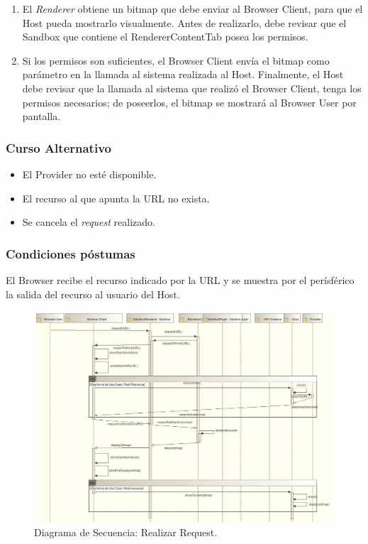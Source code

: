 \begin{enumerate}
		\item El \textit{Renderer} obtiene un bitmap que debe enviar al Browser Client, para que el Host pueda mostrarlo visualmente. Antes de realizarlo, debe revisar que el Sandbox que contiene el RendererContentTab posea los permisos.
		\item Si los permisos son suficientes, el Browser Client envía el bitmap como parámetro en la llamada al sistema realizada al Host. Finalmente, el Host debe revisar que la llamada al sistema que realizó el Browser Client, tenga los permisos necesarios; de poseerlos, el bitmap se mostrará al Browser User por pantalla.
	\end{enumerate}
\subsubsection{Curso Alternativo} 
\begin{itemize}
\item El Provider no esté disponible.
\item El recurso al que apunta la URL no exista.
\item Se cancela el \textit{request} realizado.
	\end{itemize}
\subsubsection{Condiciones póstumas} El Browser recibe el recurso indicado por la URL y se muestra por el perísférico la salida del recurso al usuario del Host.
	    \begin{figure}[h!t]
	        \centering
	        \includegraphics[scale=0.45]{figures/chap4/requestResource.jpg}
	        \caption{Diagrama de Secuencia: Realizar Request.}
	        \label{fig:SecReq}
	    \end{figure}
